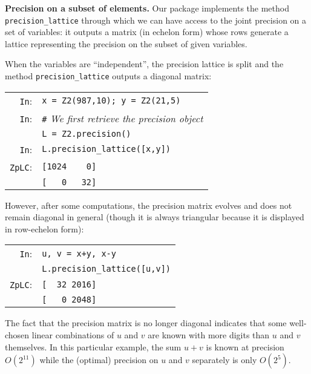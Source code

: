 \documentclass[sigconf]{acmart}
\newcommand{\cIn}{{\color{input} \tt \phantom{Zp}In}:}
\newcommand{\cZpLC}{{\color{output} \tt ZpLC}:}
\theoremstyle{definition}
\begin{document}
\noindent \textbf{Precision on a subset of elements.}
%
Our package implements the method {\color{method}\verb?precision_lattice?} through which 
we can have access to the joint precision on a set of variables: it 
outputs a matrix (in echelon form) whose rows generate a lattice 
representing the precision on the subset of given variables.

When the variables are ``independent'', the precision lattice is
split and the method {\color{method}\verb?precision_lattice?} outputs a diagonal
matrix:

\smallskip

{\noindent \small
\begin{tabular}{rl}
\cIn   & \verb?x = ?{\color{ring}\verb?Z2?}\verb?(987,10); y = ?{\color{ring}\verb?Z2?}\verb?(21,5)? \\
\cIn   & {\color{comment}\verb?#? \textit{We first retrieve the precision object}} \\
       & \verb?L = ?{\color{ring}\verb?Z2?}\verb?.?{\color{method}\verb?precision?}\verb?()?\\
\cIn   & \verb?L.?{\color{method}\verb?precision_lattice?}\verb?([x,y])? \\
\cZpLC & \verb?[1024    0]? \\
       & \verb?[   0   32]?
\end{tabular}}

\smallskip

\noindent
However, after some computations, the precision matrix evolves and 
does not remain diagonal in general (though it is always triangular
because it is displayed in row-echelon form):

\smallskip

{\noindent \small
\begin{tabular}{rl}
\cIn   & \verb?u, v = x+y, x-y? \\
       & \verb?L.?{\color{method}\verb?precision_lattice?}\verb?([u,v])? \\
\cZpLC & \verb?[  32 2016]? \\
       & \verb?[   0 2048]?
\end{tabular}}

\smallskip

\noindent
The fact that the precision matrix is no longer diagonal indicates
that some well-chosen linear combinations of $u$ and $v$ are known
with more digits than $u$ and $v$ themselves. In this particular
example, the sum $u+v$ is known at precision $O(2^{11})$ while the
(optimal) precision on $u$ and $v$ separately is only $O(2^5)$.
\end{document}
